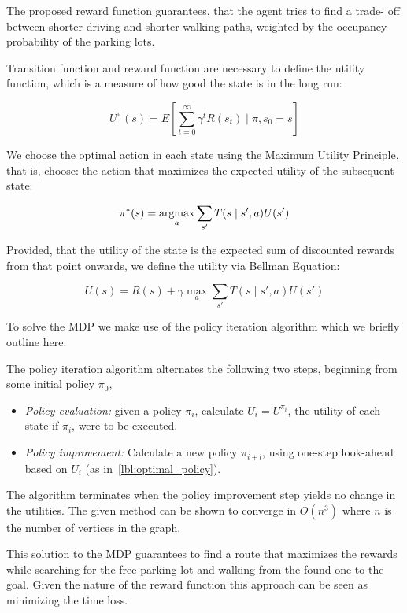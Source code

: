 The proposed reward function guarantees, that the agent tries to find a trade-
off between shorter driving and shorter walking paths, weighted by the
occupancy probability of the parking lots.

Transition function and reward function are necessary to define the utility
function, which is a measure of how good the state is in the long run:

\begin{equation}
U^{\pi}(s) = E\left[\sum_{t=0}^{\infty} \gamma^t R(s_t) \mid \pi,s_0 = s \right]
\end{equation}

We choose the optimal action in each state using the Maximum Utility
Principle, that is, choose: the action that maximizes the expected utility of
the subsequent state:

\begin{equation}
\label{lbl:optimal_policy}
\pi^*(s) = \mathop{\rm argmax}_a \sum_{s'} T(s \mid s', a)U(s')
\end{equation}

Provided, that the utility of the state is the expected sum of discounted
rewards from that point onwards, we define the utility via Bellman Equation:

\begin{equation}
\label{lbl:bellman_equation}
U(s) = R(s) + \gamma \max_a \sum_{s'}T(s \mid s', a)U(s')
\end{equation}

To solve the MDP we make use of the policy iteration algorithm which we
briefly outline here.

The policy iteration algorithm alternates the following two steps, beginning
from some initial policy $\pi_0$,

\begin{itemize}
    \item \emph{Policy evaluation:} given a policy $\pi_i$,
    calculate $U_i = U^{\pi_i}$, the utility of each state if $\pi_i$, were to be
    executed.
    \item \emph{Policy improvement:} Calculate a new policy
    $\pi_{i+l}$, using one-step look-ahead based on $U_i$ (as in~\eqref{lbl:optimal_policy}).
\end{itemize}

The algorithm terminates when the policy improvement step yields no change in
the utilities. The given method can be shown to converge in $O(n^3)$ where $n$
is the number of vertices in the graph.

This solution to the MDP guarantees to find a route that maximizes the rewards
while searching for the free parking lot and walking from the found one to the
goal. Given the nature of the reward function this approach can be seen as
minimizing the time loss.

